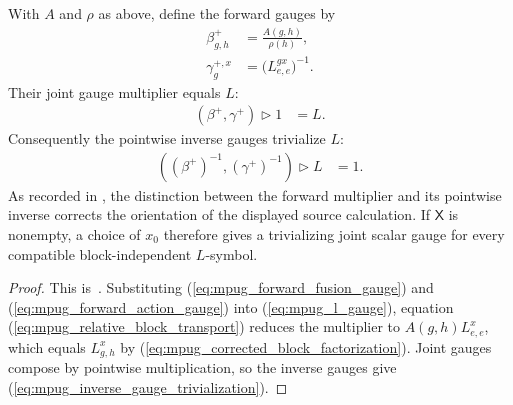 \begin{lemma}
    \label{thm:mpug_block_independence_inverse_gauge}
    \leanok
    With $A$ and $\rho$ as above, define the forward gauges by
    \begin{align}
        \beta^+_{g,h}
         & =\frac{A(g,h)}{\rho(h)},
        \label{eq:mpug_forward_fusion_gauge} \\
        \gamma^{+,x}_g
         & =\bigl(L^{g x}_{e,e}\bigr)^{-1}.
        \label{eq:mpug_forward_action_gauge}
    \end{align}
    Their joint gauge multiplier equals $L$:
    \begin{align}
        (\beta^+,\gamma^+)\mathbin{\triangleright}1
         & =L.
        \label{eq:mpug_forward_gauge_multiplier}
    \end{align}
    Consequently the pointwise inverse gauges trivialize $L$:
    \begin{align}
        ((\beta^+)^{-1},(\gamma^+)^{-1})
        \mathbin{\triangleright}L
         & =1.
        \label{eq:mpug_inverse_gauge_trivialization}
    \end{align}
    As recorded in \cite{gap:fbc25_block_independence_reciprocal_errors}, the
    distinction between the forward multiplier and its pointwise inverse
    corrects the orientation of the displayed source calculation.
    If $\mathsf X$ is nonempty, a choice of $x_0$ therefore gives a
    trivializing joint scalar gauge for every compatible block-independent
    $L$-symbol.
\end{lemma}

\begin{proof}\leanok
    This is~\cite[``Explicit inverse gauge'']{QICLean2026Blueprint}.
    Substituting (\ref{eq:mpug_forward_fusion_gauge}) and
    (\ref{eq:mpug_forward_action_gauge}) into
    (\ref{eq:mpug_l_gauge}), equation
    (\ref{eq:mpug_relative_block_transport}) reduces the multiplier to
    $A(g,h)L^x_{e,e}$, which equals $L^x_{g,h}$ by
    (\ref{eq:mpug_corrected_block_factorization}). Joint gauges compose by
    pointwise multiplication, so the inverse gauges give
    (\ref{eq:mpug_inverse_gauge_trivialization}).
\end{proof}

